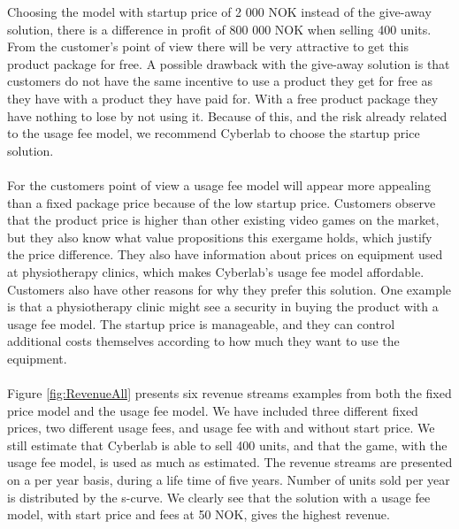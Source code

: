 Choosing the model with startup price of 2 000 NOK instead of the give-away solution, there is a difference in profit of 800 000 NOK when selling 400 units. From the customer's point of view there will be very attractive to get this product package for free. A possible drawback with the give-away solution is that customers do not have the same incentive to use a product they get for free as they have with a product they have paid for. With a free product package they have nothing to lose by not using it. Because of this, and the risk already related to the usage fee model, we recommend Cyberlab to choose the startup price solution. \\ \\ 
For the customers point of view a usage fee model will appear more appealing than a fixed package price because of the low startup price. Customers observe that the product price is higher than other existing video games on the market, but they also know what value propositions this exergame holds, which justify the price difference. They also have information about prices on equipment used at physiotherapy clinics, which makes Cyberlab’s usage fee model affordable. Customers also have other reasons for why they prefer this solution. One example is that a physiotherapy clinic might see a security in buying the product with a usage fee model. The startup price is manageable, and they can control additional costs themselves according to how much they want to use the equipment. \\ \\
Figure \ref{fig:RevenueAll} presents six revenue streams examples from both the fixed price model and the usage fee model. We have included three different fixed prices, two different usage fees, and usage fee with and without start price. We still estimate that Cyberlab is able to sell 400 units, and that the game, with the usage fee model, is used as much as estimated. The revenue streams are presented on a per year basis, during a life time of five years. Number of units sold per year is distributed by the s-curve. We clearly see that the solution with a usage fee model, with start price and fees at 50 NOK, gives the highest revenue.  
